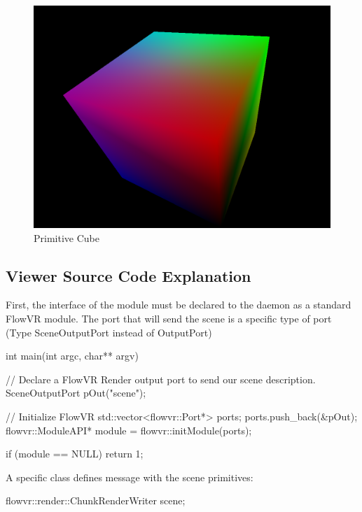 \documentclass[a4paper,12pt,titlepage]{article}
\begin{document}
\begin{figure}[ht]
    \includegraphics[width=\textwidth]{figures/cube.png}
    \caption{Primitive Cube}
\end{figure}

\subsection{Viewer Source Code Explanation}

First, the interface of the module must be declared to the daemon as a standard FlowVR module. The port that will send the scene is a specific type of port (Type SceneOutputPort instead of OutputPort)

\begin{codeflowvr_cpp}
    int main(int argc, char** argv)
    
    	// Declare a FlowVR Render output port to send our scene description.
    	SceneOutputPort pOut("scene");

    	// Initialize FlowVR
    	std::vector<flowvr::Port*> ports;
    	ports.push_back(&pOut);
    	flowvr::ModuleAPI* module = flowvr::initModule(ports);

    	if (module == NULL)
    		return 1;
\end{codeflowvr_cpp} \par

A specific class defines message with the scene primitives:
\begin{codeflowvr_cpp}
    flowvr::render::ChunkRenderWriter scene;
\end{codeflowvr_cpp}  \par
\end{document}
